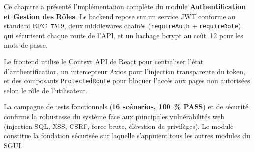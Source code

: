 \documentclass[12pt,a4paper,oneside]{report}
\begin{document}
Ce chapitre a présenté l'implémentation complète du module
\textbf{Authentification et Gestion des Rôles}. Le backend repose sur
un service JWT conforme au standard RFC~7519, deux middlewares chainés
(\texttt{requireAuth} + \texttt{requireRole}) qui sécurisent chaque
route de l'API, et un hachage bcrypt au coût~12 pour les mots de passe.

Le frontend utilise le Context API de React pour centraliser l'état
d'authentification, un intercepteur Axios pour l'injection transparente
du token, et des composants \texttt{ProtectedRoute} pour bloquer l'accès
aux pages non autorisées selon le rôle de l'utilisateur.

La campagne de tests fonctionnels (\textbf{16 scénarios, 100~\% PASS})
et de sécurité confirme la robustesse du système face aux principales
vulnérabilités web (injection SQL, XSS, CSRF, force brute, élévation
de privilèges). Le module constitue la fondation sécurisée sur laquelle
s'appuient tous les autres modules du SGUI.

\end{document}
